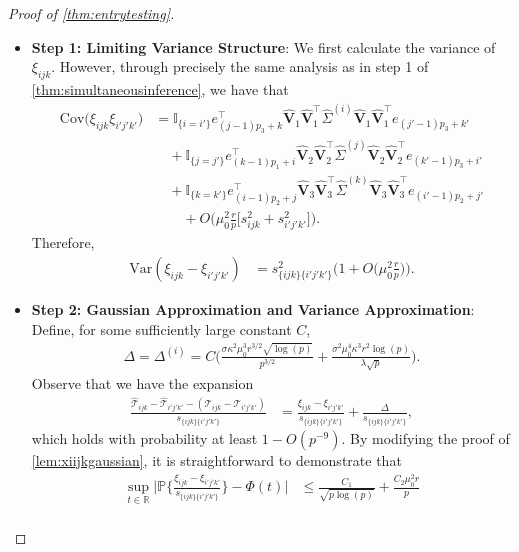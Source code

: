 \documentclass[10pt]{article}
\newcommand{\0}{{\mathbf{0}}}
\newcommand{\1}{{\mathbf{1}}}
\renewcommand{\t}{^{\top}}
\newcommand{\p}{\mathbb{P}}
\renewcommand{\hat}{\widehat}
\renewcommand{\hat}{\widehat}
\begin{document}
\begin{proof}[Proof of \cref{thm:entrytesting}]
\begin{itemize}
    \item \textbf{Step 1: Limiting Variance Structure}: We first calculate the variance of $\xi_{ijk}$.  However, through precisely the same analysis as in step 1 of \cref{thm:simultaneousinference}, we have that
\begin{align*}
    \mathrm{Cov}\bigg( \xi_{ijk} \xi_{i'j'k'} \bigg) &= \mathbb{I}_{\{i= i'\}} e_{(j-1)p_3 + k}\t  \mathbf{\hat V}_1 \mathbf{\hat V}_1\t \hat \Sigma^{(i)} \mathbf{\hat V}_1 \mathbf{\hat V}_1\t e_{(j'-1)p_3 + k'} \\
    &\quad + \mathbb{I}_{\{j= j'\}} e_{(k-1)p_1 + i}\t  \mathbf{\hat V}_2 \mathbf{\hat V}_2\t\hat \Sigma^{(j)} \mathbf{\hat V}_2 \mathbf{\hat V}_2\t e_{(k'-1)p_3 + i'}  \\
    &\quad + \mathbb{I}_{\{k= k'\}} e_{(i-1)p_2 + j}\t  \mathbf{\hat V}_3 \mathbf{\hat V}_3\t \hat \Sigma^{(k)} \mathbf{\hat V}_3 \mathbf{\hat V}_3\t e_{(i'-1)p_2 +j'} \\
    &\qquad + O\bigg(  \mu_0^2 \frac{r}{p} \bigg[ s^2_{ijk} + s^2_{i'j'k'}\bigg] \bigg).
\end{align*}
Therefore,
\begin{align*}
    \mathrm{Var}( \xi_{ijk} - \xi_{i'j'k'}) &= s^2_{\{ijk\}\{i'j'k'\}} \bigg(1 + O\bigg( \mu_0^2 \frac{r}{p} \bigg) \bigg).
\end{align*}
\item 
\textbf{Step 2: Gaussian Approximation and Variance Approximation}: 
Define, for some sufficiently large constant $C$,
\begin{align*}
    \Delta = \Delta^{(i)} = C \bigg( \frac{\sigma \kappa^2 \mu_0^3 r^{3/2} \sqrt{\log(p)}}{p^{3/2}} + \frac{\sigma^2 \mu_0^4 \kappa^3 r^2 \log(p)}{\lambda \sqrt{p}} \bigg).
\end{align*}
Observe that we have the expansion
\begin{align*}
    \frac{\mathcal{\hat T}_{ijk} - \mathcal{\hat T}_{i'j'k'} - ( \mathcal{T}_{ijk} - \mathcal{T}_{i'j'k'})}{s_{\{ijk\}\{i'j'k'\}}} &= \frac{\xi_{ijk} - \xi_{i'j'k'}}{s_{\{ijk\}\{i'j'k'\}}} + \frac{\Delta}{s_{\{ijk\}\{i'j'k'\}}},
\end{align*}
which holds with probability at least $1 - O(p^{-9})$.  By modifying the proof of \cref{lem:xiijkgaussian}, it is straightforward to demonstrate that
\begin{align*}
    \sup_{t\in \mathbb{R}} \bigg| \p\bigg\{ \frac{\xi_{ijk} - \xi_{i'j'k'}}{s_{\{ijk\}\{i'j'k'\}}} \bigg\} - \Phi(t) \bigg| &\leq \frac{C_1}{\sqrt{p\log(p)}} + \frac{C_2 \mu_0^2 r}{p} \\

\end{align*}
\end{itemize}
\end{proof}
\end{document}
